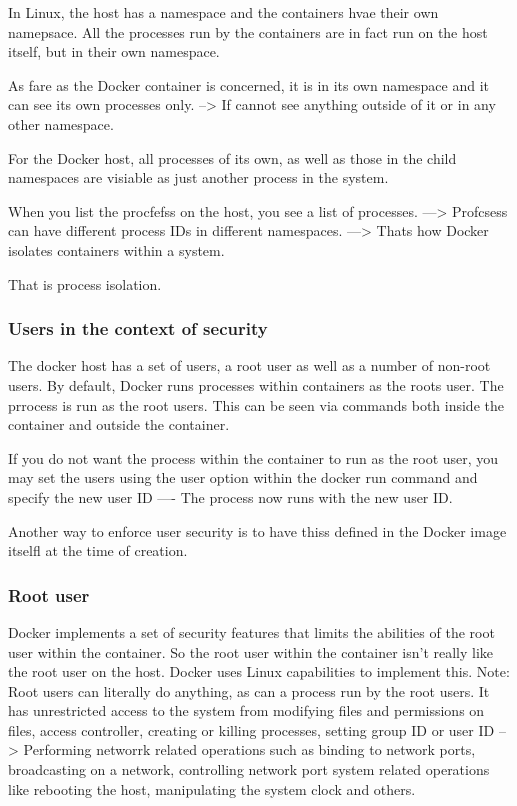\documentclass[11pt]{book}
\begin{document}
    In Linux, the host has a namespace and the containers hvae their own namepsace.
    All the processes run by the containers are in fact run on the host itself, but in their own namespace.

    As fare as the Docker container is concerned, it is in its own namespace and it can see its own processes only.
    --> If cannot see anything outside of it or in any other namespace.

    For the Docker host, all processes of its own, as well as those in the child namespaces are visiable as just another process in the system.

    When you list the procfefss on the host, you see a list of processes.
    ---> Profcsess can have different process IDs in different namespaces.
    ---> Thats how Docker isolates containers within a system.

    That is process isolation.

    \subsubsection{Users in the context of security}
    The docker host has a set of users, a root user as well as a number of non-root users.
    By default, Docker runs processes within containers as the roots user.
    The prrocess is run as the root users.
    This can be seen via commands both inside the container and outside the container.

    If you do not want the process within the container to run as the root user, you may set the users using the user option within the docker run command and specify the new user ID
    ---- The process now runs with the new user ID.

    Another way to enforce user security is to have thiss defined in the Docker image itselfl at the time of creation.

    \subsubsection{Root user}
    Docker implements a set of security features that limits the abilities of the root user within the container.
    So the root user within the container isn't really like the root user on the host.
    Docker uses Linux capabilities to implement this.
    Note: Root users can literally do anything, as can a process run by the root users.
    It has unrestricted access to the system from modifying files and permissions on files, access controller, creating or killing processes, setting group ID or user ID
    --> Performing networrk related operations such as binding to network ports, broadcasting on a network, controlling network port system related operations like rebooting the host, manipulating the system clock and others.
\end{document}
